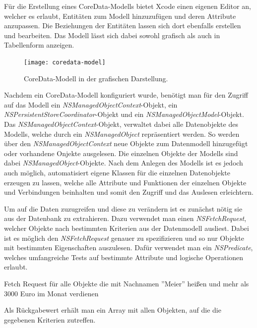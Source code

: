 Für die Erstellung eines CoreData-Modells bietet Xcode einen eigenen Editor an, welcher es erlaubt, Entitäten zum Modell hinzuzufügen und deren Attribute anzupassen. Die Beziehungen der Entitäten lassen sich dort ebenfalls erstellen und bearbeiten. Das Modell lässt sich dabei sowohl grafisch als auch in Tabellenform anzeigen.

\begin{figure}[htb!]
		\centering
	\texttt{[image: coredata-model]}
	\caption{CoreData-Modell in der grafischen Darstellung.}
	\label{coredata-model}
\end{figure}


Nachdem ein CoreData-Modell konfiguriert wurde, benötigt man für den Zugriff auf das Modell ein \emph{NSManagedObjectContext}-Objekt, ein \emph{NSPersistentStoreCoordinator}-Objekt und ein \emph{NSManagedObjectModel}-Objekt. Das \emph{NSManagedObjectContext}-Objekt, verwaltet dabei alle Datenobjekte des Modells, welche durch ein \emph{NSManagedObject} repräsentiert werden. So werden über den \emph{NSManagedObjectContext} neue Objekte zum Datenmodell hinzugefügt oder vorhandene Onjekte ausgelesen.
Die einzelnen Objekte der Modells sind dabei \emph{NSManagedObject}-Objekte. Nach dem Anlegen des Modells ist es jedoch auch möglich, automatisiert eigene Klassen für die einzelnen Datenobjekte erzeugen zu lassen, welche alle Attribute und Funktionen der einzelnen Objekte und Verbindungen beinhalten und somit den Zugriff und das Auslesen erleichtern.

Um auf die Daten zuzugreifen und diese zu verändern ist es zunächst nötig sie aus der Datenbank zu extrahieren. Dazu verwendet man einen \emph{NSFetchRequest}, welcher Objekte nach bestimmten Kriterien aus der Datenmodell ausliest.
Dabei ist es möglich den \emph{NSFetchRequest} genauer zu spezifizieren und so nur Objekte mit bestimmten Eigenschaften auszulesen.
Dafür verwendet man ein \emph{NSPredicate}, welches umfangreiche Tests auf bestimmte Attribute und logische Operationen erlaubt.

\begin{listing}[htb! breaklines=true]
    \caption{Fetch Request für alle Objekte die mit Nachnamen ''Meier'' heißen und mehr als 3000 Euro im Monat verdienen}
	\label{lst:NSFetchRequest_objc}
\end{listing}

Als Rückgabewert erhält man ein Array mit allen Objekten, auf die die gegebenen Kriterien zutreffen.


